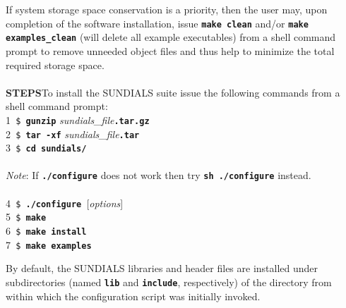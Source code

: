 \documentclass[10pt]{report}
\begin{document}
If system storage space conservation is a priority, then the user may, upon completion of the software installation, issue \texttt{\textbf{make clean}} and/or \texttt{\textbf{make examples\_clean}} (will delete all example executables) from a shell command prompt to remove unneeded object files and thus help to minimize the total required storage space.
\\
\\
\setlength{\parindent}{0cm}
\small\textbf{STEPS}\normalsize\hspace*{2ex}To install the \small SUNDIALS \normalsize suite issue the following commands from a shell command prompt:
\\
\small 1\normalsize\texttt{ \$\textbf{ gunzip}}\textit{ sundials\_file}\texttt{\textbf{.tar.gz}} \\
\small 2\normalsize\texttt{ \$\textbf{ tar -xf}}\textit{ sundials\_file}\texttt{\textbf{.tar}} \\
\small 3\normalsize\texttt{ \$\textbf{ cd}}\texttt{\textbf{ sundials/}} \\
\\
\textit{Note}: If \texttt{\textbf{./configure}} does not work then try \texttt{\textbf{sh ./configure}} instead. \\
\\
\small 4\normalsize\texttt{ \$\textbf{ ./configure }}[\textit{options}] \\
\small 5\normalsize\texttt{ \$\textbf{ make}} \\
\small 6\normalsize\texttt{ \$\textbf{ make install}} \\
\small 7\normalsize\texttt{ \$\textbf{ make examples}} \\ \setlength{\parindent}{0.5cm}

By default, the \small SUNDIALS \normalsize libraries and header files are installed under subdirectories (named \texttt{\textbf{lib}} and \texttt{\textbf{include}}, respectively) of the directory from within which the configuration script was initially invoked.
\\
\end{document}
